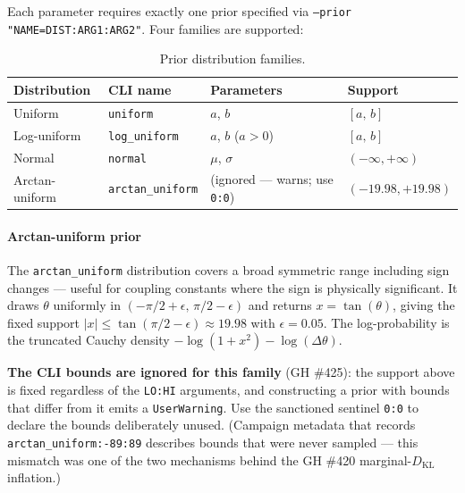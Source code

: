 Each parameter requires exactly one prior specified via
\texttt{--prior "NAME=DIST:ARG1:ARG2"}.  Four families are supported:

\begin{table}[htbp]
\centering
\caption{Prior distribution families.}
\label{tab:priors}
\begin{tabular}{@{}llll@{}}
\toprule
Distribution & CLI name & Parameters & Support \\
\midrule
Uniform              & \texttt{uniform}         & $a$, $b$     & $[a,\, b]$ \\
Log-uniform          & \texttt{log\_uniform}    & $a$, $b$ ($a>0$) & $[a,\, b]$ \\
Normal               & \texttt{normal}          & $\mu$, $\sigma$  & $(-\infty,+\infty)$ \\
Arctan-uniform       & \texttt{arctan\_uniform} & (ignored --- warns; use \texttt{0:0}) & $(-19.98,+19.98)$ \\
\bottomrule
\end{tabular}
\end{table}

\paragraph{Arctan-uniform prior}
The \texttt{arctan\_uniform} distribution covers a broad symmetric range
including sign changes --- useful for coupling constants where the sign is
physically significant.  It draws $\theta$ uniformly in
$(-\pi/2 + \epsilon,\, \pi/2 - \epsilon)$ and returns $x = \tan(\theta)$,
giving the fixed support $|x| \le \tan(\pi/2 - \epsilon) \approx 19.98$ with
$\epsilon = 0.05$.  The log-probability is the truncated Cauchy density
$-\log(1+x^2) - \log(\Delta\theta)$.

\textbf{The CLI bounds are ignored for this family} (GH \#425): the support
above is fixed regardless of the \texttt{LO:HI} arguments, and constructing
a prior with bounds that differ from it emits a \texttt{UserWarning}.  Use
the sanctioned sentinel \texttt{0:0} to declare the bounds deliberately
unused.  (Campaign metadata that records \texttt{arctan\_uniform:-89:89}
describes bounds that were never sampled --- this mismatch was one of the
two mechanisms behind the GH \#420 marginal-$D_\mathrm{KL}$ inflation.)

